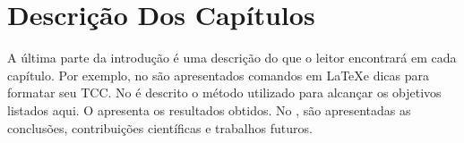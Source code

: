 \section{Descrição Dos Capítulos}

A última parte da introdução é uma descrição do que o leitor encontrará em cada capítulo.
Por exemplo, no  são apresentados comandos em \LaTeX e dicas para formatar seu TCC.
No  é descrito o método utilizado para alcançar os objetivos listados aqui.
O  apresenta os resultados obtidos.
No , são apresentadas as conclusões, contribuições científicas e trabalhos futuros.









